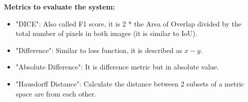 	\textbf{Metrics to evaluate the system:}
	\begin{itemize}
		\item "DICE": Also called F1 score, it is 2 * the Area of Overlap divided by the total number of pixels in both images (it is similar to IoU).
		\item "Difference": Similar to loss function, it is described as $x - y$.
		\item "Absolute Difference": It is difference metric but in absolute value.
		\item "Hausdorff Distance": Calculate the distance between 2 subsets of a metric space are from each other.
	\end{itemize}
%
%	
%

